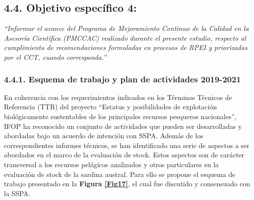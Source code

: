 \documentclass[
  spanish,
]{article}
\begin{document}
\pagebreak

\hypertarget{objetivo-especuxedfico-4-1}{%
\subsection{4.4. Objetivo específico
4:}\label{objetivo-especuxedfico-4-1}}

\vspace{-0.2cm}

\emph{``Informar el avance del Programa de Mejoramiento Continuo de la
Calidad en la Asesoría Científica (PMCCAC) realizado durante el presente
estudio, respecto al cumplimiento de recomendaciones formuladas en
procesos de RPEI y priorizadas por el CCT, cuando corresponda.''}
\vspace{0.5cm}

\hypertarget{esquema-de-trabajo-y-plan-de-actividades-2019-2021}{%
\subsubsection{4.4.1. Esquema de trabajo y plan de actividades
2019-2021}\label{esquema-de-trabajo-y-plan-de-actividades-2019-2021}}

En coherencia con los requerimientos indicados en los Términos Técnicos
de Referencia (TTR) del proyecto ``Estatus y posibilidades de
explotación biológicamente sustentables de los principales recursos
pesqueros nacionales'', IFOP ha reconocido un conjunto de actividades
que pueden ser desarrolladas y abordadas bajo un acuerdo de intención
con SSPA. Además de los correspondientes informes técnicos, se han
identificado una serie de aspectos a ser abordados en el marco de la
evaluación de stock. Estos aspectos son de carácter transversal a los
recursos pelágicos analizados y otros particulares en la evaluación de
stock de la sardina austral. Para ello se propone el esquema de trabajo
presentado en la \textbf{Figura \ref{Fig17}}, el cual fue discutido y
consensuado con la SSPA.

\vspace{0.5cm}
\end{document}
